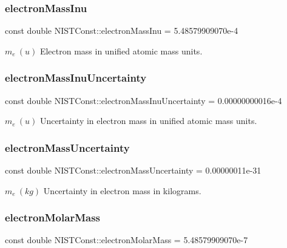 \subsubsection{\texorpdfstring{electron\+Mass\+Inu}{electronMassInu}}
{\footnotesize\ttfamily const double N\+I\+S\+T\+Const\+::electron\+Mass\+Inu = 5.\+48579909070e-\/4}

$m_e \ (u)$ Electron mass in unified atomic mass units. \mbox{\label{group___electron_ga8f8888c07573f5b4f8c1ebb553383592}} 
\subsubsection{\texorpdfstring{electron\+Mass\+Inu\+Uncertainty}{electronMassInuUncertainty}}
{\footnotesize\ttfamily const double N\+I\+S\+T\+Const\+::electron\+Mass\+Inu\+Uncertainty = 0.\+00000000016e-\/4}

$m_e \ (u)$ Uncertainty in electron mass in unified atomic mass units. \mbox{\label{group___electron_ga558edc70a085ccbed99ad3e485b8abda}} 
\subsubsection{\texorpdfstring{electron\+Mass\+Uncertainty}{electronMassUncertainty}}
{\footnotesize\ttfamily const double N\+I\+S\+T\+Const\+::electron\+Mass\+Uncertainty = 0.\+00000011e-\/31}

$m_e \ (kg)$ Uncertainty in electron mass in kilograms. \mbox{\label{group___electron_gaebecd54c70326d72d25d790c0ab62145}} 
\subsubsection{\texorpdfstring{electron\+Molar\+Mass}{electronMolarMass}}
{\footnotesize\ttfamily const double N\+I\+S\+T\+Const\+::electron\+Molar\+Mass = 5.\+48579909070e-\/7}

